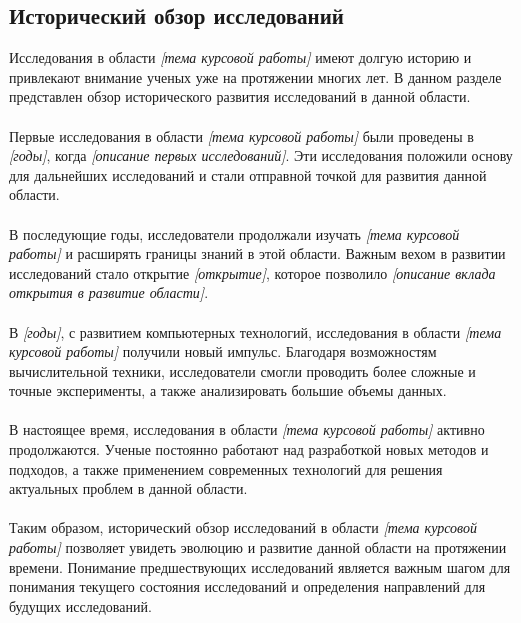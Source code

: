 \documentclass{article}
\begin{document}
\subsection{Исторический обзор исследований}
Исследования в области \textit{[тема курсовой работы]} имеют долгую историю и привлекают внимание ученых уже на протяжении многих лет. В данном разделе представлен обзор исторического развития исследований в данной области.\\
~\\
Первые исследования в области \textit{[тема курсовой работы]} были проведены в \textit{[годы]}, когда \textit{[описание первых исследований]}. Эти исследования положили основу для дальнейших исследований и стали отправной точкой для развития данной области.\\
~\\
В последующие годы, исследователи продолжали изучать \textit{[тема курсовой работы]} и расширять границы знаний в этой области. Важным вехом в развитии исследований стало открытие \textit{[открытие]}, которое позволило \textit{[описание вклада открытия в развитие области]}.\\
~\\
В \textit{[годы]}, с развитием компьютерных технологий, исследования в области \textit{[тема курсовой работы]} получили новый импульс. Благодаря возможностям вычислительной техники, исследователи смогли проводить более сложные и точные эксперименты, а также анализировать большие объемы данных.\\
~\\
В настоящее время, исследования в области \textit{[тема курсовой работы]} активно продолжаются. Ученые постоянно работают над разработкой новых методов и подходов, а также применением современных технологий для решения актуальных проблем в данной области.\\
~\\
Таким образом, исторический обзор исследований в области \textit{[тема курсовой работы]} позволяет увидеть эволюцию и развитие данной области на протяжении времени. Понимание предшествующих исследований является важным шагом для понимания текущего состояния исследований и определения направлений для будущих исследований.
\end{document}
